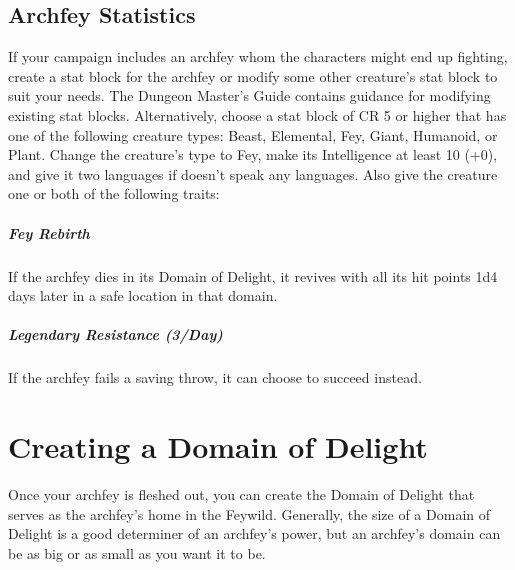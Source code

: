 \documentclass[10pt,a4paper,twoside,twocolumn,openany,nodeprecatedcode,bg=print]{dndbook}
\begin{document}
\section{Archfey Statistics}
If your campaign includes an archfey whom the characters might end up fighting, create a stat block for the archfey or modify some other creature's stat block to suit your needs. The Dungeon Master's Guide contains guidance for modifying existing stat blocks.
Alternatively, choose a stat block of CR 5 or higher that has one of the following creature types: Beast, Elemental, Fey, Giant, Humanoid, or Plant. Change the creature's type to Fey, make its Intelligence at least 10 (+0), and give it two languages if doesn't speak any languages. Also give the creature one or both of the following traits:
\paragraph{Fey Rebirth}
If the archfey dies in its Domain of Delight, it revives with all its hit points 1d4 days later in a safe location in that domain.
\paragraph{Legendary Resistance (3/Day)}
If the archfey fails a saving throw, it can choose to succeed instead.
\chapter{Creating a Domain of Delight}
Once your archfey is fleshed out, you can create the Domain of Delight that serves as the archfey's home in the Feywild. Generally, the size of a Domain of Delight is a good determiner of an archfey's power, but an archfey's domain can be as big or as small as you want it to be.
\end{document}
